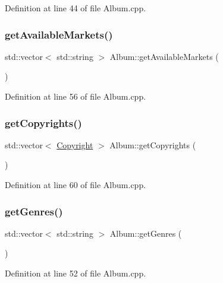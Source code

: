 Definition at line 44 of file Album.\+cpp.

\mbox{\label{class_album_a64d390a4e116f149a0cc3d5e36846215}} 
\subsubsection{\texorpdfstring{get\+Available\+Markets()}{getAvailableMarkets()}}
{\footnotesize\ttfamily std\+::vector$<$ std\+::string $>$ Album\+::get\+Available\+Markets (\begin{DoxyParamCaption}{ }\end{DoxyParamCaption})}



Definition at line 56 of file Album.\+cpp.

\mbox{\label{class_album_abc64299bf27888be4724ffd1c30266a4}} 
\subsubsection{\texorpdfstring{get\+Copyrights()}{getCopyrights()}}
{\footnotesize\ttfamily std\+::vector$<$ \mbox{\hyperlink{class_copyright}{Copyright}} $>$ Album\+::get\+Copyrights (\begin{DoxyParamCaption}{ }\end{DoxyParamCaption})}



Definition at line 60 of file Album.\+cpp.

\mbox{\label{class_album_a9bb76a0e2a0648972cb5fa76d143f7a1}} 
\subsubsection{\texorpdfstring{get\+Genres()}{getGenres()}}
{\footnotesize\ttfamily std\+::vector$<$ std\+::string $>$ Album\+::get\+Genres (\begin{DoxyParamCaption}{ }\end{DoxyParamCaption})}



Definition at line 52 of file Album.\+cpp.

